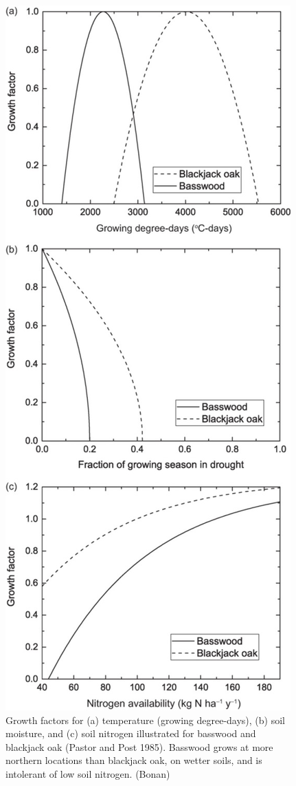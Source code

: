 \documentclass[
  12pt,
  oneside]{book}
\begin{document}
\begin{figure}

{\centering \includegraphics[width=0.8\linewidth]{figures/chap6/f625_growth_factorbis} 

}

\caption{Growth factors for (a) temperature (growing degree-days), (b) soil moisture, and (c) soil nitrogen illustrated for basswood and blackjack oak (Pastor and Post 1985). Basswood grows at more northern locations than blackjack oak, on wetter soils, and is intolerant of low soil nitrogen. (Bonan)}\label{fig:f625}
\end{figure}
\end{document}
